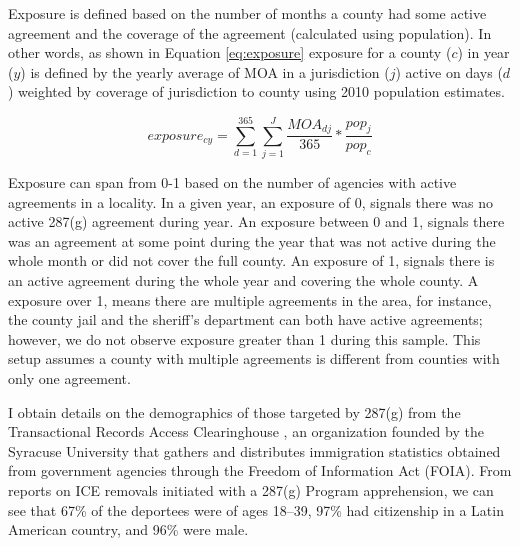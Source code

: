 \documentclass{article}
\begin{document}
Exposure is defined based on the number of months a county had some active agreement and the coverage of the agreement (calculated using population). In other words, as shown in Equation \ref{eq:exposure} exposure for a county ($c$) in year ($y$) is defined by the yearly average of MOA in a jurisdiction ($j$) active on days ($d$) weighted by coverage of jurisdiction to county using 2010 population estimates.

\begin{equation}
\label{eq:exposure}
    exposure_{cy} = \sum_{d=1}^{365} \sum_{j=1} ^{J} \frac{MOA_{dj}}{365} * \frac{pop_{j}}{pop_{c}}
\end{equation}

Exposure can span from 0-1 based on the number of agencies with active agreements in a locality. In a given year, an exposure of 0, signals there was no active 287(g) agreement during year. An exposure between 0 and 1, signals there was an agreement at some point during the year that was not active during the whole month or did not cover the full county. An exposure of 1, signals there is an active agreement during the whole year and covering the whole county. A exposure over 1, means there are multiple agreements in the area, for instance, the county jail and the sheriff's department can both have active agreements; however, we do not observe exposure greater than 1 during this sample. This setup assumes a county with multiple agreements is different from counties with only one agreement.

I obtain details on the demographics of those targeted by 287(g) from the Transactional Records Access Clearinghouse \citep{trac24}, an organization founded by the Syracuse University that gathers and distributes immigration statistics obtained from government agencies through the Freedom of Information Act (FOIA). From reports on ICE removals initiated with a 287(g) Program apprehension, we can see that 67\% of the deportees were of ages 18--39, 97\% had citizenship in a Latin American country, and 96\% were male. 
\end{document}
